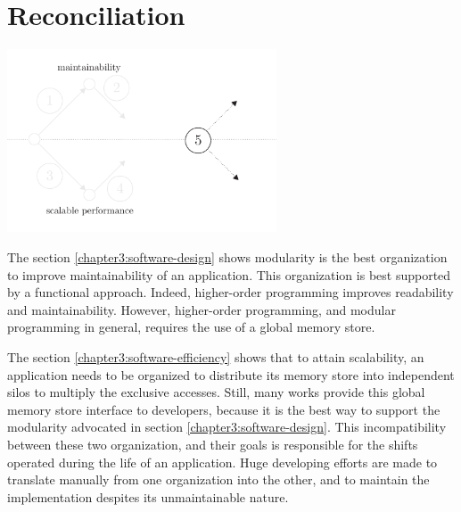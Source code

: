 \section{Reconciliation} \label{chapter3:objectives}


\begin{center}
\includegraphics[width=0.6\textwidth]{../ressources/state-of-the-art-5.pdf}
\end{center}


The section \ref{chapter3:software-design} shows modularity is the best organization to improve maintainability of an application.
This organization is best supported by a functional approach.
Indeed, higher-order programming improves readability and maintainability.
However, higher-order programming, and modular programming in general, requires the use of a global memory store.

The section \ref{chapter3:software-efficiency} shows that to attain scalability, an application needs to be organized to distribute its memory store into independent silos to multiply the exclusive accesses.
Still, many works provide this global memory store interface to developers, because it is the best way to support the modularity advocated in section \ref{chapter3:software-design}.
This incompatibility between these two organization, and their goals is responsible for the shifts operated during the life of an application.
Huge developing efforts are made to translate manually from one organization into the other, and to maintain the implementation despites its unmaintainable nature.

